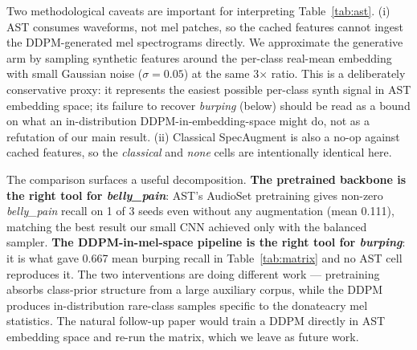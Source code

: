 \documentclass[10pt]{article}
\begin{document}
Two methodological caveats are important for interpreting Table~\ref{tab:ast}. (i) AST consumes waveforms, not mel patches, so the cached features cannot ingest the DDPM-generated mel spectrograms directly. We approximate the generative arm by sampling synthetic features around the per-class real-mean embedding with small Gaussian noise ($\sigma{=}0.05$) at the same 3$\times$ ratio. This is a deliberately conservative proxy: it represents the easiest possible per-class synth signal in AST embedding space; its failure to recover \textit{burping} (below) should be read as a bound on what an in-distribution DDPM-in-embedding-space might do, not as a refutation of our main result. (ii) Classical SpecAugment is also a no-op against cached features, so the \textit{classical} and \textit{none} cells are intentionally identical here.

\begin{table}[!ht]
\centering
\footnotesize
\renewcommand{\arraystretch}{0.95}
\caption{AST linear-probe matrix (4 arms $\times$ weighted\_ce $\times$ 3 seeds). Mean [min, max] across seeds. The pretrained backbone recovers \textit{belly\_pain} that the small CNN never does; the embedding-space synth proxy does not recover \textit{burping}, which our DDPM-in-mel-space pipeline does (Table~\ref{tab:matrix}).}\label{tab:ast}
\end{table}

The comparison surfaces a useful decomposition. \textbf{The pretrained backbone is the right tool for \textit{belly\_pain}}: AST's AudioSet pretraining gives non-zero \textit{belly\_pain} recall on 1 of 3 seeds even without any augmentation (mean 0.111), matching the best result our small CNN achieved only with the balanced sampler. \textbf{The DDPM-in-mel-space pipeline is the right tool for \textit{burping}}: it is what gave 0.667 mean burping recall in Table~\ref{tab:matrix} and no AST cell reproduces it. The two interventions are doing different work --- pretraining absorbs class-prior structure from a large auxiliary corpus, while the DDPM produces in-distribution rare-class samples specific to the donateacry mel statistics. The natural follow-up paper would train a DDPM directly in AST embedding space and re-run the matrix, which we leave as future work.
\end{document}
